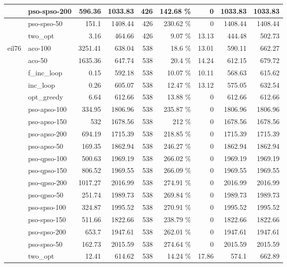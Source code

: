 \documentclass[conference]{IEEEtran}
\begin{document}
\begin{center}
\begin{longtable}[ht]{|l|l|r|r|r|r|r|r|r|}
 & pso-spso-200 & 596.36 & 1033.83 & 426 & 142.68 \% & 0 & 1033.83 & 1033.83 \\ \hline
 & pso-spso-50 & 151.1 & 1408.44 & 426 & 230.62 \% & 0 & 1408.44 & 1408.44 \\ \hline
 & two\_opt & 3.16 & 464.66 & 426 & 9.07 \% & 13.13 & 444.48 & 502.73 \\ \hline
eil76 & aco-100 & 3251.41 & 638.04 & 538 & 18.6 \% & 13.01 & 590.11 & 662.27 \\ \hline
 & aco-50 & 1635.36 & 647.74 & 538 & 20.4 \% & 14.24 & 612.15 & 679.72 \\ \hline
 & f\_inc\_loop & 0.15 & 592.18 & 538 & 10.07 \% & 10.11 & 568.63 & 615.62 \\ \hline
 & inc\_loop & 0.26 & 605.07 & 538 & 12.47 \% & 13.12 & 575.05 & 632.54 \\ \hline
 & opt\_greedy & 6.64 & 612.66 & 538 & 13.88 \% & 0 & 612.66 & 612.66 \\ \hline
 & pso-apso-100 & 334.95 & 1806.96 & 538 & 235.87 \% & 0 & 1806.96 & 1806.96 \\ \hline
 & pso-apso-150 & 532 & 1678.56 & 538 & 212 \% & 0 & 1678.56 & 1678.56 \\ \hline
 & pso-apso-200 & 694.19 & 1715.39 & 538 & 218.85 \% & 0 & 1715.39 & 1715.39 \\ \hline
 & pso-apso-50 & 169.35 & 1862.94 & 538 & 246.27 \% & 0 & 1862.94 & 1862.94 \\ \hline
 & pso-qpso-100 & 500.63 & 1969.19 & 538 & 266.02 \% & 0 & 1969.19 & 1969.19 \\ \hline
 & pso-qpso-150 & 806.52 & 1969.55 & 538 & 266.09 \% & 0 & 1969.55 & 1969.55 \\ \hline
 & pso-qpso-200 & 1017.27 & 2016.99 & 538 & 274.91 \% & 0 & 2016.99 & 2016.99 \\ \hline
 & pso-qpso-50 & 251.74 & 1989.73 & 538 & 269.84 \% & 0 & 1989.73 & 1989.73 \\ \hline
 & pso-spso-100 & 324.87 & 1995.52 & 538 & 270.91 \% & 0 & 1995.52 & 1995.52 \\ \hline
 & pso-spso-150 & 511.66 & 1822.66 & 538 & 238.79 \% & 0 & 1822.66 & 1822.66 \\ \hline
 & pso-spso-200 & 653.7 & 1947.61 & 538 & 262.01 \% & 0 & 1947.61 & 1947.61 \\ \hline
 & pso-spso-50 & 162.73 & 2015.59 & 538 & 274.64 \% & 0 & 2015.59 & 2015.59 \\ \hline
 & two\_opt & 12.41 & 614.62 & 538 & 14.24 \% & 17.86 & 574.1 & 662.89 \\ \hline

\end{longtable}
\end{center}
\end{document}
